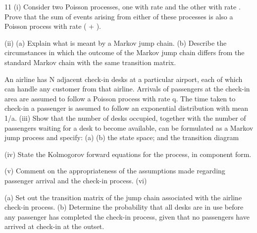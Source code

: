 \documentclass[a4paper,12pt]{article}
\begin{document}
\begin{enumerate}
11
(i) Consider two Poisson processes, one with rate \lambda and the other with rate \mu .
Prove that the sum of events arising from either of these processes is also a
Poisson process with rate ( \lambda + \mu ).

(ii) (a) Explain what is meant by a Markov jump chain.
(b) Describe the circumstances in which the outcome of the Markov jump
chain differs from the standard Markov chain with the same transition
matrix.

An airline has N adjacent check-in desks at a particular airport, each of which can
handle any customer from that airline. Arrivals of passengers at the check-in area are assumed to follow a Poisson process with rate q. The time taken to check-in a
passenger is assumed to follow an exponential distribution with mean 1/a.
(iii)
Show that the number of desks occupied, together with the number of passengers waiting for a desk to become available, can be formulated as a
Markov jump process and specify:
(a)
(b)
the state space; and
the transition diagram

(iv) State the Kolmogorov forward equations for the process, in component form.

(v) Comment on the appropriateness of the assumptions made regarding passenger arrival and the check-in process.
(vi)

(a) Set out the transition matrix of the jump chain associated with the airline check-in process.
(b) Determine the probability that all desks are in use before any passenger has completed the check-in process, given that no passengers have
arrived at check-in at the outset.


\end{enumerate}
\end{document}

